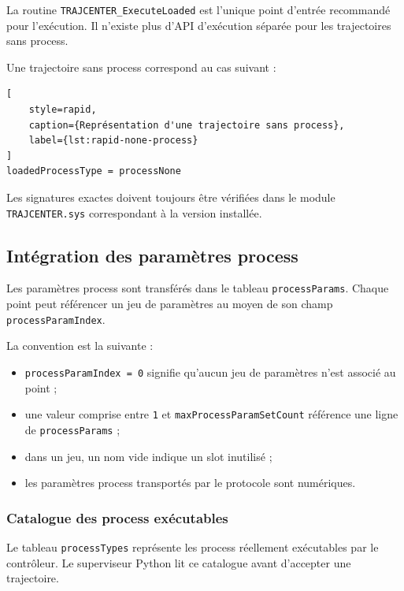\documentclass{rapportENSAM}
\begin{document}
La routine \texttt{TRAJCENTER\_ExecuteLoaded} est l'unique point d'entrée
recommandé pour l'exécution. Il n'existe plus d'API d'exécution séparée pour
les trajectoires sans process.

Une trajectoire sans process correspond au cas suivant :

\begin{lstlisting}[
    style=rapid,
    caption={Représentation d'une trajectoire sans process},
    label={lst:rapid-none-process}
]
loadedProcessType = processNone
\end{lstlisting}

Les signatures exactes doivent toujours être vérifiées dans le module
\texttt{TRAJCENTER.sys} correspondant à la version installée.


\subsection{Intégration des paramètres process}
\label{subsec:rapid-process-integration}

Les paramètres process sont transférés dans le tableau
\texttt{processParams}. Chaque point peut référencer un jeu de paramètres au
moyen de son champ \texttt{processParamIndex}.

La convention est la suivante :

\begin{itemize}
    \item \texttt{processParamIndex = 0} signifie qu'aucun jeu de paramètres
    n'est associé au point ;
    \item une valeur comprise entre \texttt{1} et
    \texttt{maxProcessParamSetCount} référence une ligne de
    \texttt{processParams} ;
    \item dans un jeu, un nom vide indique un slot inutilisé ;
    \item les paramètres process transportés par le protocole sont numériques.
\end{itemize}


\subsubsection{Catalogue des process exécutables}
\label{subsubsec:rapid-process-limitations}

Le tableau \texttt{processTypes} représente les process réellement
exécutables par le contrôleur. Le superviseur Python lit ce catalogue avant
d'accepter une trajectoire.
\end{document}
